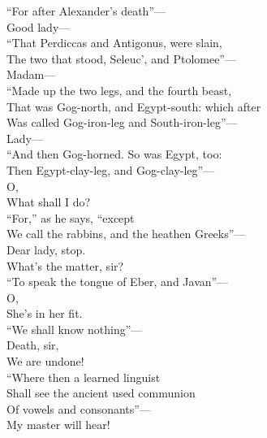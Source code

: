 \documentclass[a4paper,oneside,12pt]{memoir}
\begin{document}
\begin{drama*}
\dolspeaks ``For after Alexander's death''---\\
\mammonspeaks {} Good lady---\\
\dolspeaks ``That Perdiccas and Antigonus, were slain,\\
The two that stood, Seleuc', and Ptolomee''---\\
\mammonspeaks Madam---\\
\dolspeaks {} ``Made up the two legs, and the fourth beast,\\
That was Gog-north, and Egypt-south: which after\\
Was called Gog-iron-leg and South-iron-leg''---\\
\mammonspeaks Lady---\\
\dolspeaks {} ``And then Gog-horned. So was Egypt, too:\\
Then Egypt-clay-leg, and Gog-clay-leg''---\\
\mammonspeaks {} O,\\
What shall I do?\\
\dolspeaks {} ``For,'' as he says, ``except\\
We call the rabbins, and the heathen Greeks''---\\
\mammonspeaks Dear lady, stop.\\
\facespeaks {} What's the matter, sir?\\
\dolspeaks ``To speak the tongue of Eber, and Javan''---\\
\mammonspeaks {} O,\\
She's in her fit.\\
\dolspeaks {} ``We shall know nothing''---\\
\facespeaks {} Death, sir,\\
We are undone!\\
\dolspeaks {} ``Where then a learned linguist\\
Shall see the ancient used communion\\
Of vowels and consonants''---\\
\facespeaks {} My master will hear!\\

\end{drama*}
\end{document}
